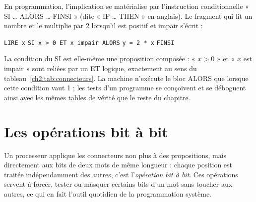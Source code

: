En programmation, l'implication se matérialise par l'instruction conditionnelle « SI \ldots{} ALORS \ldots{} FINSI » (dite « IF \ldots{} THEN » en anglais). Le fragment qui lit un nombre et le multiplie par 2 lorsqu'il est positif et impair s'écrit :
\begin{center}
\texttt{LIRE x} \quad \texttt{SI x > 0 ET x impair ALORS} \quad \texttt{y = 2 * x} \quad \texttt{FINSI}
\end{center}
La condition du SI est elle-même une proposition composée : « $x > 0$ » et « $x$ est impair » sont reliées par un ET logique, exactement au sens du tableau~\ref{ch2:tab:connecteurs}. La machine n'exécute le bloc ALORS que lorsque cette condition vaut 1 ; les tests d'un programme se conçoivent et se déboguent ainsi avec les mêmes tables de vérité que le reste du chapitre.

\section{Les opérations bit à bit}

Un processeur applique les connecteurs non plus à des propositions, mais directement aux bits de deux mots de même longueur : chaque position est traitée indépendamment des autres, c'est l'\emph{opération bit à bit}. Ces opérations servent à forcer, tester ou masquer certains bits d'un mot sans toucher aux autres, ce qui en fait l'outil quotidien de la programmation système.

